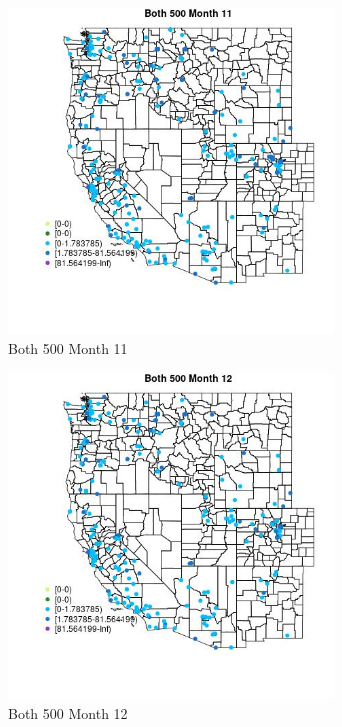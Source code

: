 \begin{figure} 
\centering  
\includegraphics[width=0.77\textwidth]{Code_Outputs/Report_ML_input_PM25_Step4_part_e_de_duplicated_aveswNAs_MapObsMo11Both_500.jpg} 
\caption{\label{fig:Report_ML_input_PM25_Step4_part_e_de_duplicated_aveswNAsMapObsMo11Both_500}Both 500 Month 11} 
\end{figure} 
 

\clearpage 

\begin{figure} 
\centering  
\includegraphics[width=0.77\textwidth]{Code_Outputs/Report_ML_input_PM25_Step4_part_e_de_duplicated_aveswNAs_MapObsMo12Both_500.jpg} 
\caption{\label{fig:Report_ML_input_PM25_Step4_part_e_de_duplicated_aveswNAsMapObsMo12Both_500}Both 500 Month 12} 
\end{figure} 
 

